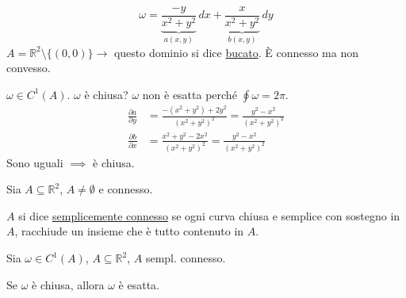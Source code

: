 \begin{esercizio}
\[
\omega = \underbrace{\frac{-y}{x^2 + y^2}}_{a(x, y)}\, dx + \underbrace{\frac{x}{x^2 + y^2}}_{b(x, y)}\, dy
\]
$A = \mathbb{R}^2 \setminus \{ (0, 0) \} \to$ questo dominio si dice \underline{bucato}. È connesso ma non convesso.

$\omega \in C^1(A)$. $\omega$ è chiusa? $\omega$ non è esatta perché $\displaystyle\oint \omega = 2\pi$.
\begin{align*}
\frac{\partial a}{\partial y} &= \frac{-(x^2 + y^2) + 2y^2}{(x^2 + y^2)^2} = \frac{y^2 - x^2}{(x^2 + y^2)^2} \\[4pt]
\frac{\partial b}{\partial x} &= \frac{x^2 + y^2 - 2x^2}{(x^2 + y^2)^2} = \frac{y^2 - x^2}{(x^2 + y^2)^2}
\end{align*}
Sono uguali $\implies$ è chiusa.
\end{esercizio}

\begin{definition}
Sia $A \subseteq \mathbb{R}^2$, $A \neq \emptyset$ e connesso.

$A$ si dice \underline{semplicemente connesso} se ogni curva chiusa e semplice con sostegno in $A$, racchiude un insieme che è tutto contenuto in $A$.
\end{definition}

\begin{theorem}[Rimandato]
Sia $\omega \in C^1(A)$, $A \subseteq \mathbb{R}^2$, $A$ sempl. connesso.

Se $\omega$ è chiusa, allora $\omega$ è esatta.
\end{theorem}

